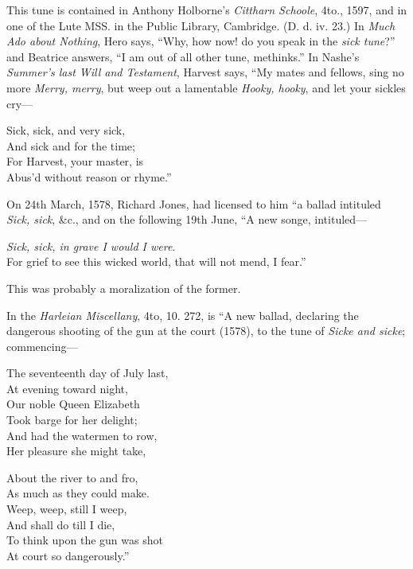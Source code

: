 
This tune is contained in Anthony Holborne’s \textit{Cittharn Schoole}, 4to., 1597, and
in one of the Lute MSS. in the Public Library, Cambridge. (D. d. iv. 23.) In
\textit{Much Ado about Nothing}, Hero says, “Why, how now! do you speak in the \textit{sick
tune}?” and Beatrice answers, “I am out of all other tune, methinks.” In
Nashe’s \textit{Summer’s last Will and Testament}, Harvest says, “My mates and fellows,
sing no more \textit{Merry, merry}, but weep out a lamentable \textit{Hooky, hooky}, and let your
sickles cry—
\settowidth{\versewidth}{For Harvest, your master, is}
\begin{scverse}
\begin{altverse}
Sick, sick, and very sick,\\
And sick and for the time;\\
For Harvest, your master, is\\
Abus’d without reason or rhyme.”
\end{altverse}
\end{scverse}

On 24th March, 1578, Richard Jones, had licensed to him “a ballad intituled
\textit{Sick, sick}, \&c., and on the following 19th June, “A new songe, intituled—
\settowidth{\versewidth}{For grief to see this wicked world, that will not mend, I fear.”}
\begin{scverse}
\textit{Sick, sick, in grave I would I were}.\\
For grief to see this wicked world, that will not mend, I fear.”
\end{scverse}
This was probably a moralization of the former.

In the \textit{Harleian Miscellany}, 4to, 10. 272, is “A new ballad, declaring the
dangerous shooting of the gun at the court (1578), to the tune of \textit{Sicke and sicke};
commencing—
\settowidth{\versewidth}{The seventeenth day of July last,}
\begin{dcverse}\settowidth{\versewidth}{And had the watermen to row,}
\begin{altverse}
The seventeenth day of July last,\\
At evening toward night,\\
Our noble Queen Elizabeth\\
Took barge for her delight;\\
And had the watermen to row,\\
Her pleasure she might take,
\end{altverse}

\settowidth{\versewidth}{To think upon the gun was shot}
\begin{patverse}
About the river to and fro,\\
As much as they could make.\\
Weep, weep, still I weep,\\
And shall do till I die,\\
To think upon the gun was shot\\
At court so dangerously.”
\end{patverse}
\end{dcverse}

